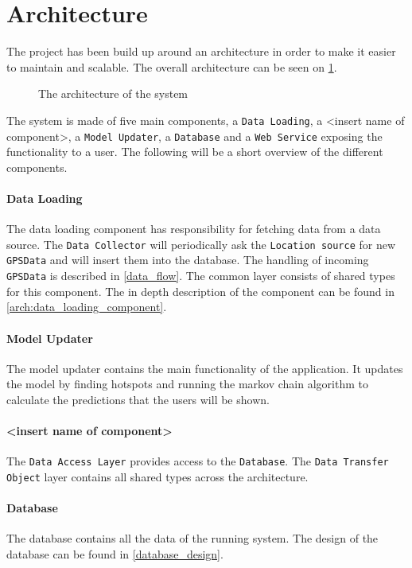\section{Architecture}
The project has been build up around an architecture in order to make it easier to maintain and scalable.
The overall architecture can be seen on \cref{arch}.

\begin{figure}[h]
\center

\caption{The architecture of the system}
\label{arch}
\end{figure}

The system is made of five main components, a \texttt{Data Loading}, a <insert name of component>, a \texttt{Model Updater}, a \texttt{Database} and a \texttt{Web Service} exposing the functionality to a user.
The following will be a short overview of the different components.

\paragraph{Data Loading}
The data loading component has responsibility for fetching data from a data source.
The \texttt{Data Collector} will periodically ask the \texttt{Location source} for new \texttt{GPSData} and will insert them into the database. 
The handling of incoming \texttt{GPSData} is described in  \cref{data_flow}.
The common layer consists of shared types for this component.
The in depth description of the component can be found in \cref{arch:data_loading_component}.

\paragraph{Model Updater}
The model updater contains the main functionality of the application.
It updates the model by finding hotspots and running the markov chain algorithm to calculate the predictions that the users will be shown.

\paragraph{<insert name of component>}
The \texttt{Data Access Layer} provides access to the \texttt{Database}.
The \texttt{Data Transfer Object} layer contains all shared types across the architecture.

\paragraph{Database}
The database contains all the data of the running system.
The design of the database can be found in \cref{database_design}.

